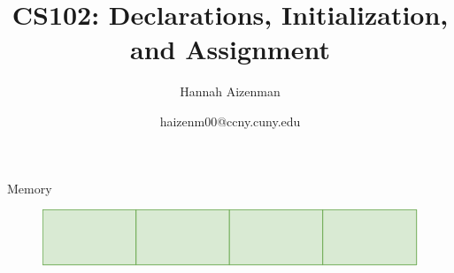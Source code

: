 \documentclass[xcolor={dvipsnames}]{beamer}
\begin{document}
\title{ CS102: Declarations, Initialization, and Assignment }
\author{Hannah Aizenman}
\date{haizenm00@ccny.cuny.edu}


\begin{frame}
	\titlepage
\end{frame}


\begin{frame}{Memory}

\begin{block}
	\begin{figure}
		\includegraphics[width=1\textwidth]{memory}
	\end{figure}
\end{block}


\end{frame}
%
%
%
%
\end{document}
